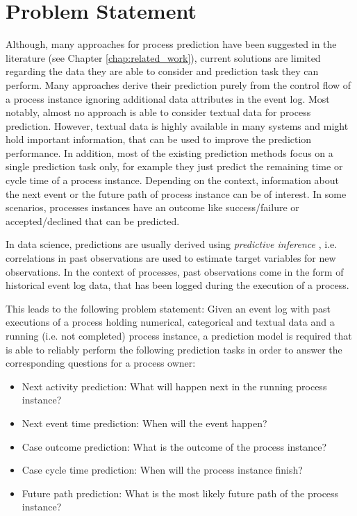 \section{Problem Statement}

Although, many approaches for process prediction have been suggested in the literature (see Chapter \ref{chap:related_work}), current solutions are limited regarding the data they are able to consider and prediction task they can perform.
Many approaches derive their prediction purely from the control flow of a process instance ignoring additional data attributes in the event log.
Most notably, almost no approach is able to consider textual data for process prediction.
However, textual data is highly available in many systems and might hold important information, that can be used to improve the prediction performance.
In addition, most of the existing prediction methods focus on a single prediction task only, for example they just predict the remaining time or cycle time of a process instance.
Depending on the context, information about the next event or the future path of process instance can be of interest.
In some scenarios, processes instances have an outcome like success/failure or accepted/declined that can be predicted.

In data science, predictions are usually derived using \textit{predictive inference} \cite{predinf}, i.e. correlations in past observations are used to estimate target variables for new observations.
In the context of processes, past observations come in the form of historical event log data, that has been logged during the execution of a process.

This leads to the following problem statement:
Given an event log with past executions of a process holding numerical, categorical and textual data and a running (i.e. not completed) process instance, a prediction model is required that is able to reliably perform the following prediction tasks in order to answer the corresponding questions for a process owner:

\begin{itemize}
	\item Next activity prediction: What will happen next in the running process instance?
	\item Next event time prediction: When will the event happen?
	\item Case outcome prediction: What is the outcome of the process instance?
	\item Case cycle time prediction: When will the process instance finish?
	\item Future path prediction: What is the most likely future path of the process instance?
\end{itemize}

